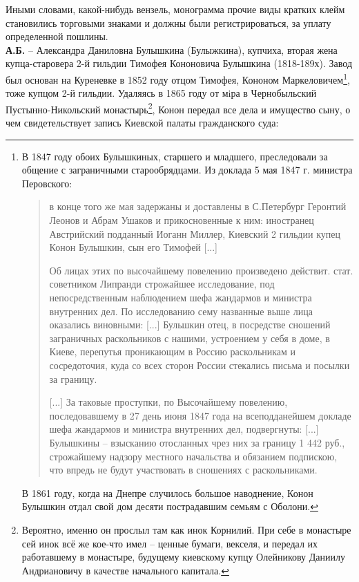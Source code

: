 Иными словами, какой-нибудь вензель, монограмма прочие виды кратких клейм становились торговыми знаками и должны были регистрироваться, за уплату определенной пошлины.\\

\noindent\textbf{А.Б.} – Александра Даниловна Булышкина (Булыжкина), купчиха, вторая жена купца-старовера 2-й гильдии Тимофея Кононовича Булышкина (1818-189х). Завод был основан на Куреневке в 1852 году отцом Тимофея, Кононом Маркеловичем\footnote{В 1847 году обоих Булышкиных, старшего и младшего, преследовали за общение с заграничными старообрядцами. Из доклада 5 мая 1847 г. министра Перовского: 

\begin{quotation}
в конце того же мая задержаны и доставлены в С.Петербург Геронтий Леонов и Абрам Ушаков и прикосновенные к ним: иностранец Австрийский подданный Иоганн Миллер, Киевский 2 гильдии купец Конон Булышкин, сын его Тимофей [...]

Об лицах этих по высочайшему повелению произведено действит. стат. советником Липранди строжайшее исследование, под непосредственным наблюдением шефа жандармов и министра внутренних дел. По исследованию сему названные выше лица оказались виновными: [...] Бульшкин отец, в посредстве сношений заграничных раскольников с нашими, устроением у себя в доме, в Киеве, перепутья проникающим в Россию раскольникам и сосредоточия, куда со всех сторон России стекались письма и посылки за границу. 

[...] За таковые проступки, по Высочайшему повелению, последовавшему в 27 день июня 1847 года на всеподданейшем докладе шефа жандармов и министра внутренних дел, подвергнуты: [...] Булышкины – взысканию отосланных чрез них за границу 1 442 руб., строжайшему надзору местного начальства и обязанием подпискою, что впредь не будут участвовать в сношениях с раскольниками. 
\end{quotation}

В 1861 году, когда на Днепре случилось большое наводнение, Конон Булышкин отдал свой дом десяти пострадавшим семьям с Оболони.}, тоже купцом 2-й гильдии. Удаляясь в 1865 году от мiра в Чернобыльский Пустынно-Никольский монастырь\footnote{Вероятно, именно он прослыл там как инок Корнилий. При себе в монастыре сей инок всё же кое-что имел – ценные бумаги, векселя, и передал их работавшему в монастыре, будущему киевскому купцу Олейникову Даниилу Андриановичу в качестве начального капитала.}, Конон передал все дела и имущество сыну, о чем свидетельствует запись Киевской палаты гражданского суда:

